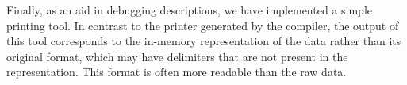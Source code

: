 Finally, as an aid in debugging \padsml{} descriptions, we have implemented a simple printing tool.  In contrast to the printer generated by the \padsml{} compiler, the output of this tool corresponds to the in-memory
representation of the data rather than its original format, which may have delimiters \etc{} that are not present in the representation.  This format is often more readable than the raw data.

